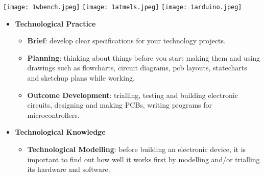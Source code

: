\texttt{[image: 1wbench.jpeg]}
\texttt{[image: 1atmels.jpeg]}
\texttt{[image: 1arduino.jpeg]}
 

\secdown
{}

\begin{itemize}
  \item \textbf{Technological Practice\\}
  \begin{itemize}
    \item \textbf{Brief}: develop clear specifications for your technology
    projects.\\
    \item \textbf{Planning}: thinking about things before you start making them
    and using drawings such as flowcharts, circuit diagrams, pcb layouts,
    statecharts and sketchup plans while working.\\
    \item \textbf{Outcome Development}: trialling, testing and building
    electronic circuits, designing and making PCBs, writing programs for
    microcontrollers.\\
  \end{itemize}
  \item \textbf{Technological Knowledge\\}
  \begin{itemize}
    \item \textbf{Technological Modelling}: before building an electronic
    device, it is important to find out how well it works first by modelling
    and/or trialling its hardware and software.\\
\end{itemize}
\end{itemize}
